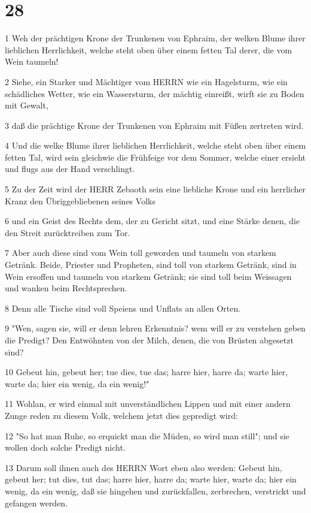 \chapter{28}

\par 1 Weh der prächtigen Krone der Trunkenen von Ephraim, der welken Blume ihrer lieblichen Herrlichkeit, welche steht oben über einem fetten Tal derer, die vom Wein taumeln!
\par 2 Siehe, ein Starker und Mächtiger vom HERRN wie ein Hagelsturm, wie ein schädliches Wetter, wie ein Wassersturm, der mächtig einreißt, wirft sie zu Boden mit Gewalt,
\par 3 daß die prächtige Krone der Trunkenen von Ephraim mit Füßen zertreten wird.
\par 4 Und die welke Blume ihrer lieblichen Herrlichkeit, welche steht oben über einem fetten Tal, wird sein gleichwie die Frühfeige vor dem Sommer, welche einer ersieht und flugs aus der Hand verschlingt.
\par 5 Zu der Zeit wird der HERR Zebaoth sein eine liebliche Krone und ein herrlicher Kranz den Übriggebliebenen seines Volks
\par 6 und ein Geist des Rechts dem, der zu Gericht sitzt, und eine Stärke denen, die den Streit zurücktreiben zum Tor.
\par 7 Aber auch diese sind vom Wein toll geworden und taumeln von starkem Getränk. Beide, Priester und Propheten, sind toll von starkem Getränk, sind in Wein ersoffen und taumeln von starkem Getränk; sie sind toll beim Weissagen und wanken beim Rechtsprechen.
\par 8 Denn alle Tische sind voll Speiens und Unflats an allen Orten.
\par 9 "Wen, sagen sie, will er denn lehren Erkenntnis? wem will er zu verstehen geben die Predigt? Den Entwöhnten von der Milch, denen, die von Brüsten abgesetzt sind?
\par 10 Gebeut hin, gebeut her; tue dies, tue das; harre hier, harre da; warte hier, warte da; hier ein wenig, da ein wenig!"
\par 11 Wohlan, er wird einmal mit unverständlichen Lippen und mit einer andern Zunge reden zu diesem Volk, welchem jetzt dies gepredigt wird:
\par 12 "So hat man Ruhe, so erquickt man die Müden, so wird man still"; und sie wollen doch solche Predigt nicht.
\par 13 Darum soll ihnen auch des HERRN Wort eben also werden: Gebeut hin, gebeut her; tut dies, tut das; harre hier, harre da; warte hier, warte da; hier ein wenig, da ein wenig, daß sie hingehen und zurückfallen, zerbrechen, verstrickt und gefangen werden.
